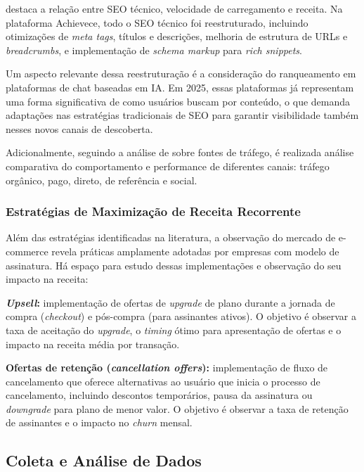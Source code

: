 \cite{bansal_seo_2024} destaca a relação entre SEO técnico, velocidade de carregamento e receita. Na plataforma Achievece, todo o SEO técnico foi reestruturado, incluindo otimizações de \textit{meta tags}, títulos e descrições, melhoria de estrutura de URLs e \textit{breadcrumbs}, e implementação de \textit{schema markup} para \textit{rich snippets}.

Um aspecto relevante dessa reestruturação é a consideração do ranqueamento em plataformas de chat baseadas em IA. Em 2025, essas plataformas já representam uma forma significativa de como usuários buscam por conteúdo, o que demanda adaptações nas estratégias tradicionais de SEO para garantir visibilidade também nesses novos canais de descoberta.

Adicionalmente, seguindo a análise de \cite{muralidhar_clicks_2024} sobre fontes de tráfego, é realizada análise comparativa do comportamento e performance de diferentes canais: tráfego orgânico, pago, direto, de referência e social.

\subsubsection{Estratégias de Maximização de Receita Recorrente}

Além das estratégias identificadas na literatura, a observação do mercado de e-commerce revela práticas amplamente adotadas por empresas com modelo de assinatura. Há espaço para estudo dessas implementações e observação do seu impacto na receita:

\textbf{\textit{Upsell}:} implementação de ofertas de \textit{upgrade} de plano durante a jornada de compra (\textit{checkout}) e pós-compra (para assinantes ativos). O objetivo é observar a taxa de aceitação do \textit{upgrade}, o \textit{timing} ótimo para apresentação de ofertas e o impacto na receita média por transação.

\textbf{Ofertas de retenção (\textit{cancellation offers}):} implementação de fluxo de cancelamento que oferece alternativas ao usuário que inicia o processo de cancelamento, incluindo descontos temporários, pausa da assinatura ou \textit{downgrade} para plano de menor valor. O objetivo é observar a taxa de retenção de assinantes e o impacto no \textit{churn} mensal.

\subsection{Coleta e Análise de Dados}

